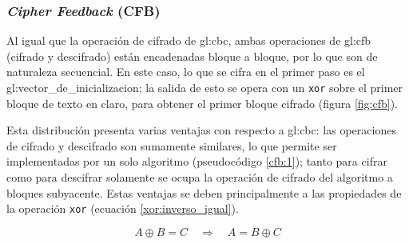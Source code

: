 %
%

\subsubsection{\textit{Cipher Feedback} (CFB)}

Al igual que la operación de cifrado de \gls{gl:cbc}, ambas operaciones
de \gls{gl:cfb} (cifrado y descifrado) están encadenadas bloque a bloque,
por lo que son de naturaleza secuencial. En este caso, lo que se cifra en el
primer paso es el \gls{gl:vector_de_inicializacion}; la salida de esto se opera
con un \verb|xor| sobre el primer bloque de texto en claro, para obtener el
primer bloque cifrado (figura \ref{fig:cfb}).

Esta distribución presenta varias ventajas con respecto a \gls{gl:cbc}:
las operaciones de cifrado y descifrado son sumamente similares, lo que permite
ser implementadas por un solo algoritmo (pseudocódigo \ref{cfb:1}); tanto para
cifrar como para descifrar solamente se ocupa la operación de cifrado del
algoritmo a bloques subyacente. Estas ventajas se deben principalmente a las
propiedades de la operación \verb|xor| (ecuación \ref{xor:inverso_igual}).

\begin{equation}
  \label{xor:inverso_igual}
  A \oplus B = C \quad \Rightarrow \quad A = B \oplus C
\end{equation}

